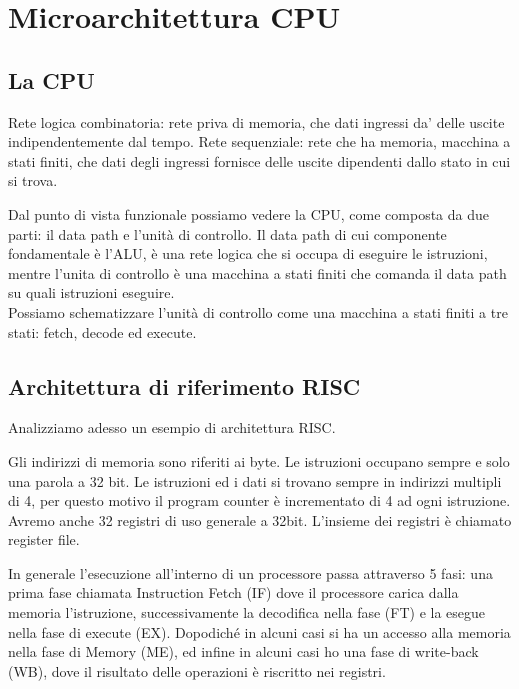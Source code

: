 \documentclass[../ace.tex]{subfiles}
\begin{document}
\section{Microarchitettura CPU}
\subsection{La CPU}
Rete logica combinatoria: rete priva di memoria, che dati ingressi da' delle uscite indipendentemente
dal tempo.
Rete sequenziale: rete che ha memoria, macchina a stati finiti, che dati degli ingressi fornisce
delle uscite dipendenti dallo stato in cui si trova.

Dal punto di vista funzionale possiamo vedere la CPU, come composta da due parti: il data path e
l'unità di controllo.
Il data path di cui componente fondamentale è l'ALU, è una rete logica che si occupa di eseguire le istruzioni, mentre
l'unita di controllo è una macchina a stati finiti che comanda il data path su quali istruzioni eseguire.
\\
Possiamo schematizzare l'unità di controllo come una macchina a stati finiti a tre stati: fetch, decode ed execute.

\subsection{Architettura di riferimento RISC}
Analizziamo adesso un esempio di architettura RISC.

Gli indirizzi di memoria sono riferiti ai byte. Le istruzioni occupano sempre e solo una parola a 32 bit.
Le istruzioni ed i dati si trovano sempre in indirizzi multipli di 4, per questo motivo il program counter
è incrementato di 4 ad ogni istruzione.
Avremo anche 32 registri di uso generale a 32bit. L'insieme dei registri è chiamato register file.

In generale l'esecuzione all'interno di un processore passa attraverso 5 fasi:
una prima fase chiamata Instruction Fetch (IF) dove il processore carica dalla memoria l'istruzione,
successivamente la decodifica nella fase (FT) e la esegue nella fase di execute (EX).
Dopodiché in alcuni casi si ha un accesso alla memoria nella fase di Memory (ME), ed infine
in alcuni casi ho una fase di write-back (WB), dove il risultato delle operazioni è riscritto
nei registri.
\end{document}
